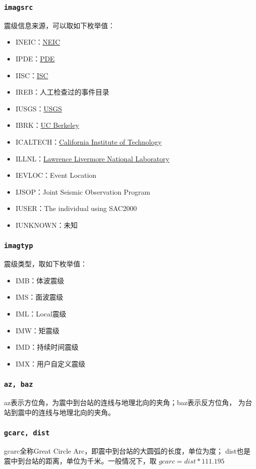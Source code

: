 \subsubsection{\texttt{imagsrc}}
震级信息来源，可以取如下枚举值：
\begin{itemize}
\ttfamily
\item INEIC：\href{http://earthquake.usgs.gov/regional/neic/}{NEIC}
\item IPDE：\href{http://earthquake.usgs.gov/data/pde.php}{PDE}
\item IISC：\href{http://www.isc.ac.uk/}{ISC}
\item IREB：人工检查过的事件目录
\item IUSGS：\href{http://earthquake.usgs.gov}{USGS}
\item IBRK：\href{http://seismo.berkeley.edu/}{UC Berkeley}
\item ICALTECH：\href{http://www.seismolab.caltech.edu}{California Institute of Technology}
\item ILLNL：\href{https://www.llnl.gov/}{Lawrence Livermore National Laboratory}
\item IEVLOC：Event Location
\item IJSOP：Joint Seismic Observation Program
\item IUSER：The individual using SAC2000
\item IUNKNOWN：未知
\end{itemize}

\subsubsection{\texttt{imagtyp}}
震级类型，取如下枚举值：
\begin{itemize}
\ttfamily
\item IMB：体波震级
\item IMS：面波震级
\item IML：Local震级
\item IMW：矩震级
\item IMD：持续时间震级
\item IMX：用户自定义震级
\end{itemize}

\subsubsection{\texttt{az, baz}}
az表示方位角，为震中到台站的连线与地理北向的夹角；baz表示反方位角，
为台站到震中的连线与地理北向的夹角。

\subsubsection{\texttt{gcarc, dist}}
gcarc全称Great Circle Arc，即震中到台站的大圆弧的长度，单位为度；
dist也是震中到台站的距离，单位为千米。一般情况下，取
$gcarc = dist*111.195 $

